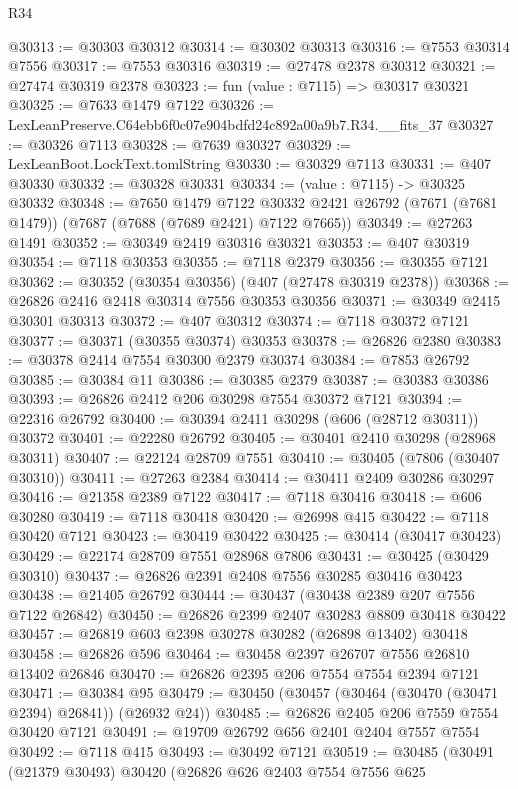 \begin{lexlean}{R34}
\begin{coremodule}
@30313 := @30303 @30312
@30314 := @30302 @30313
@30316 := @7553 @30314 @7556
@30317 := @7553 @30316
@30319 := @27478 @2378 @30312
@30321 := @27474 @30319 @2378
@30323 := fun (value : @7115) => @30317 @30321
@30325 := @7633 @1479 @7122
@30326 := LexLeanPreserve.C64ebb6f0c07e904bdfd24c892a00a9b7.R34.__fits_37
@30327 := @30326 @7113
@30328 := @7639 @30327
@30329 := LexLeanBoot.LockText.tomlString
@30330 := @30329 @7113
@30331 := @407 @30330
@30332 := @30328 @30331
@30334 := (value : @7115) -> @30325 @30332
@30348 := @7650
    @1479
    @7122
    @30332
    @2421
    @26792
    (@7671 (@7681 @1479))
    (@7687 (@7688 (@7689 @2421) @7122 @7665))
@30349 := @27263 @1491
@30352 := @30349 @2419 @30316 @30321
@30353 := @407 @30319
@30354 := @7118 @30353
@30355 := @7118 @2379
@30356 := @30355 @7121
@30362 := @30352 (@30354 @30356) (@407 (@27478 @30319 @2378))
@30368 := @26826 @2416 @2418 @30314 @7556 @30353 @30356
@30371 := @30349 @2415 @30301 @30313
@30372 := @407 @30312
@30374 := @7118 @30372 @7121
@30377 := @30371 (@30355 @30374) @30353
@30378 := @26826 @2380
@30383 := @30378 @2414 @7554 @30300 @2379 @30374
@30384 := @7853 @26792
@30385 := @30384 @11
@30386 := @30385 @2379
@30387 := @30383 @30386
@30393 := @26826 @2412 @206 @30298 @7554 @30372 @7121
@30394 := @22316 @26792
@30400 := @30394 @2411 @30298 (@606 (@28712 @30311)) @30372
@30401 := @22280 @26792
@30405 := @30401 @2410 @30298 (@28968 @30311)
@30407 := @22124 @28709 @7551
@30410 := @30405 (@7806 (@30407 @30310))
@30411 := @27263 @2384
@30414 := @30411 @2409 @30286 @30297
@30416 := @21358 @2389 @7122
@30417 := @7118 @30416
@30418 := @606 @30280
@30419 := @7118 @30418
@30420 := @26998 @415
@30422 := @7118 @30420 @7121
@30423 := @30419 @30422
@30425 := @30414 (@30417 @30423)
@30429 := @22174 @28709 @7551 @28968 @7806
@30431 := @30425 (@30429 @30310)
@30437 := @26826 @2391 @2408 @7556 @30285 @30416 @30423
@30438 := @21405 @26792
@30444 := @30437 (@30438 @2389 @207 @7556 @7122 @26842)
@30450 := @26826 @2399 @2407 @30283 @8809 @30418 @30422
@30457 := @26819 @603 @2398 @30278 @30282 (@26898 @13402) @30418
@30458 := @26826 @596
@30464 := @30458 @2397 @26707 @7556 @26810 @13402 @26846
@30470 := @26826 @2395 @206 @7554 @7554 @2394 @7121
@30471 := @30384 @95
@30479 := @30450 (@30457 (@30464 (@30470 (@30471 @2394) @26841)) (@26932 @24))
@30485 := @26826 @2405 @206 @7559 @7554 @30420 @7121
@30491 := @19709 @26792 @656 @2401 @2404 @7557 @7554
@30492 := @7118 @415
@30493 := @30492 @7121
@30519 := @30485
    (@30491
      (@21379 @30493)
      @30420
      (@26826
        @626
        @2403
        @7554
        @7556
        @625

\end{coremodule}
\end{lexlean}
